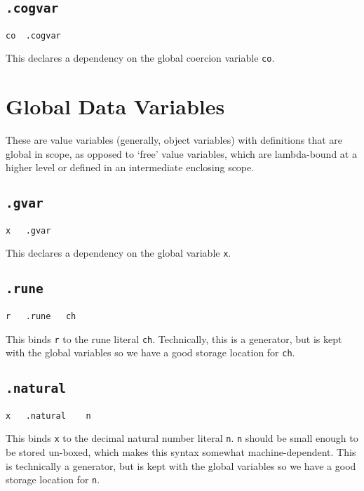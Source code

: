 \documentclass{report}
\newcommand\stringcode[1]{\texttt{#1}}
\begin{document}
\subsection{\stringcode{.cogvar}}

\begin{verbatim}
co	.cogvar
\end{verbatim}

This declares a dependency on the global coercion variable \stringcode{co}.

\section{Global Data Variables}
\label{value_gvar}

These are value variables (generally, object variables) with definitions that are global in scope,
as opposed to `free' value variables, which are lambda-bound at a higher level or defined in an intermediate enclosing scope.

\subsection{\stringcode{.gvar}}

\begin{verbatim}
x	.gvar
\end{verbatim}

This declares a dependency on the global variable \stringcode{x}.

\subsection{\stringcode{.rune}}

\begin{verbatim}
r	.rune	ch
\end{verbatim}

This binds \stringcode{r} to the rune literal \stringcode{ch}.
Technically, this is a generator, but is kept with the global variables so we have a good storage location for \stringcode{ch}.

\subsection{\stringcode{.natural}}

\begin{verbatim}
x	.natural	n
\end{verbatim}

This binds \stringcode{x} to the decimal natural number literal \stringcode{n}.
\stringcode{n} should be small enough to be stored un-boxed, which makes this syntax somewhat machine-dependent.
This is technically a generator, but is kept with the global variables so we have a good storage location for \stringcode{n}.
\end{document}
